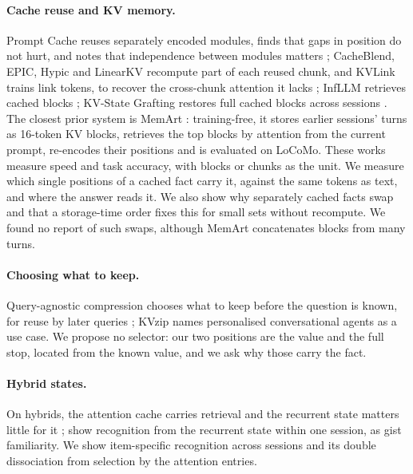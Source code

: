 \documentclass[11pt]{article}
\begin{document}
\paragraph{Cache reuse and KV memory.} Prompt Cache reuses separately encoded modules, finds that gaps in position do
not hurt, and notes that independence between modules matters \citep{gim2024promptcache}; CacheBlend, EPIC, Hypic and
LinearKV recompute part of each reused chunk, and KVLink trains link tokens, to recover the cross-chunk attention it
lacks \citep{yao2025cacheblend,hu2025epic,liu2026hypic,liu2026linearkv,yang2025kvlink}; InfLLM retrieves cached
blocks \citep{xiao2024infllm}; KV-State Grafting restores full cached blocks across sessions
\citep{schelpe2026grafting}. The closest prior system is MemArt \citep{zeng2026memart}: training-free, it stores
earlier sessions' turns as 16-token KV blocks, retrieves the top blocks by attention from the current prompt,
re-encodes their positions and is evaluated on LoCoMo. These works measure speed and task accuracy, with blocks or
chunks as the unit. We measure which single positions of a cached fact carry it, against the same tokens as text, and
where the answer reads it. We also show why separately cached facts swap and that a storage-time order fixes this for
small sets without recompute. We found no report of such swaps, although MemArt concatenates blocks from many turns.

\paragraph{Choosing what to keep.} Query-agnostic compression chooses what to keep before the question is known, for
reuse by later queries \citep{kim2025kvzip,kim2026epicache,devoto2025expected}; KVzip names personalised
conversational agents as a use case. We propose no selector: our two positions are the value and the full stop,
located from the known value, and we ask why those carry the fact.

\paragraph{Hybrid states.} On hybrids, the attention cache carries retrieval and the recurrent state matters little for
it \citep{yu2026dasc}; \citet{afendulev2026hybrid} show recognition from the recurrent state within one session, as
gist familiarity. We show item-specific recognition across sessions and its double dissociation from selection by the
attention entries.
\end{document}
